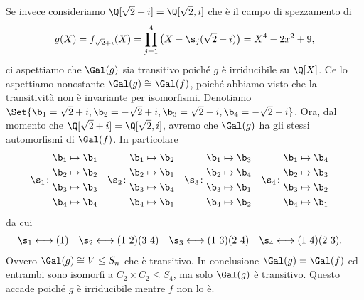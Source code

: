 \begin{oss}
	Se invece consideriamo \(\Q[\sqrt{2}+i]=\Q[\sqrt{2},i]\) che è il campo di spezzamento di
	\[
		g(X) = f_{\sqrt{2}+i}(X) = \prod_{j=1}^4 \big(X-\s_j(\sqrt{2}+i)\big) = X^4-2x^2+9,
	\]
	ci aspettiamo che \(\Gal(g)\) sia transitivo poiché \(g\) è irriducibile su \(\Q[X]\). Ce lo aspettiamo nonostante \(\Gal(g)\cong \Gal(f)\), poiché abbiamo visto che la transitività non è invariante per isomorfismi.
	Denotiamo \(\Set{\b_1=\sqrt{2}+i,\b_2=-\sqrt{2}+i,\b_3=\sqrt{2}-i,\b_4=-\sqrt{2}-i}\). Ora, dal momento che \(\Q[\sqrt{2}+i]=\Q[\sqrt{2},i]\), avremo che \(\Gal(g)\) ha gli stessi automorfismi di \(\Gal(f)\). In particolare
	\begin{align*}
		\s_1 & \colon \begin{aligned}\b_1 &\mapsto \b_1\\\b_2 &\mapsto \b_2\\\b_3 &\mapsto \b_3\\\b_4 &\mapsto \b_4\end{aligned} & \s_2 & \colon \begin{aligned}\b_1 &\mapsto \b_2\\\b_2 &\mapsto \b_1\\\b_3 &\mapsto \b_4\\\b_4 &\mapsto \b_1\end{aligned} & 
		\s_3 & \colon \begin{aligned}\b_1 &\mapsto \b_3\\\b_2 &\mapsto \b_4\\\b_3 &\mapsto \b_1\\\b_4 &\mapsto \b_2\end{aligned} & \s_4 & \colon \begin{aligned}\b_1 &\mapsto \b_4\\\b_2 &\mapsto \b_3\\\b_3 &\mapsto \b_2\\\b_4 &\mapsto \b_1\end{aligned}
	\end{align*}
	da cui
	\begin{align*}
		\s_1 & \longleftrightarrow (1) & \s_2 & \longleftrightarrow (1\ 2)(3\ 4) & \s_3 & \longleftrightarrow (1\ 3)(2\ 4) & \s_4 & \longleftrightarrow (1\ 4)(2\ 3).
	\end{align*}
	Ovvero \(\Gal(g) \cong V\le S_n\) che è transitivo. In conclusione \(\Gal(g)=\Gal(f)\) ed entrambi sono isomorfi a \(C_2\times C_2\le S_4\), ma solo \(\Gal(g)\) è transitivo. Questo accade poiché \(g\) è irriducibile mentre \(f\) non lo è.
\end{oss}

